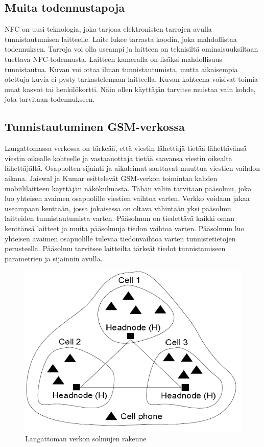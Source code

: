 \documentclass[finnish]{tktltiki2}
\theoremstyle{definition}
\theoremstyle{remark}
\begin{document}
\subsection{Muita todennustapoja}

NFC on uusi teknologia, joka tarjoaa elektronisten tarrojen avulla tunnistautumisen laitteelle. Laite lukee tarrasta koodin, joka mahdollistaa todennuksen. Tarroja voi olla useampi ja laitteen on teknisiltä ominaisuuksiltaan tuettava NFC-todennusta. Laitteen kameralla on lisäksi mahdollisuus tunnistautua. Kuvan voi ottaa ilman tunnistautumista, mutta aikaisempia otettuja kuvia ei pysty tarkastelemaan laitteella. Kuvan kohteena voisivat toimia omat kasvot tai henkilökortti. Näin ollen käyttäjän tarvitse muistaa vain kohde, jota tarvitaan todennukseen.

\subsection{Tunnistautuminen GSM-verkossa}

Langattomassa verkossa on tärkeää, että viestin lähettäjä tietää lähettävänsä viestin oikealle kohteelle ja vastaanottaja tietää saavansa viestin oikealta lähettäjältä. Osapuolten sijainti ja aikaleimat saattavat muuttua viestien vaihdon aikana. Jaiswal ja Kumar \cite{cell} esittelevät GSM-verkon toimintaa kahden mobiililaitteen käyttäjän näkökulmasta. Tähän väliin tarvitaan pääsolmu, joka luo yhteisen avaimen osapuolille viestien vaihtoa varten. Verkko voidaan jakaa useampaan kenttään, jossa jokaisessa on oltava vähintään yksi pääsolmu laitteiden tunnistautumista varten. Pääsolmun on tiedettävä kaikki oman kenttänsä laitteet ja muita pääsolmuja tiedon vaihtoa varten. Pääsolmun luo yhteisen avaimen osapuolille tulevaa tiedonvaihtoa varten tunnistetietojen perusteella. Pääsolmu tarvitsee laitteilta tärkeät tiedot tunnistamiseen parametrien ja sijainnin avulla.

\begin{figure}[h!]
\centering
	\includegraphics[scale=0.6]{nodes}
\caption{Langattoman verkon solmujen rakenne \cite{cell}}
\end{figure}	
\end{document}
